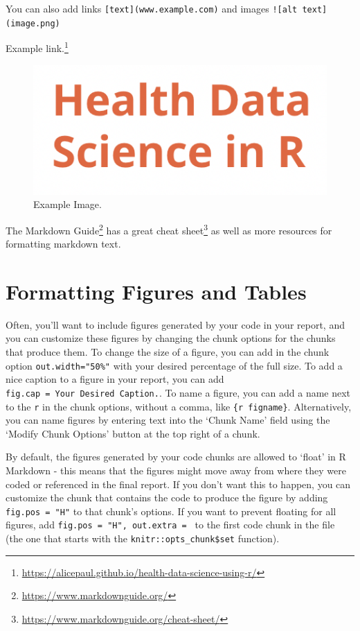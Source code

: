 \documentclass[
  letterpaper,
]{krantz}
\renewcommand{\href}[2]{#2\footnote{\url{#1}}}
\begin{document}
You can also add links \texttt{{[}text{]}(www.example.com)} and images
\texttt{!{[}alt\ text{]}(image.png)}

\href{https://alicepaul.github.io/health-data-science-using-r/}{Example
link.}

\begin{figure}

{\centering \includegraphics{book/../images/logo.png}

}

\caption{Example Image.}

\end{figure}

\href{https://www.markdownguide.org/}{The Markdown Guide} has a great
\href{https://www.markdownguide.org/cheat-sheet/}{cheat sheet} as well
as more resources for formatting markdown text.

\hypertarget{formatting-figures-and-tables}{%
\section{Formatting Figures and
Tables}\label{formatting-figures-and-tables}}

Often, you'll want to include figures generated by your code in your
report, and you can customize these figures by changing the chunk
options for the chunks that produce them. To change the size of a
figure, you can add in the chunk option \texttt{out.width="50\%"} with
your desired percentage of the full size. To add a nice caption to a
figure in your report, you can add
\texttt{fig.cap\ =\ \textquotesingle{}Your\ Desired\ Caption.}. To name
a figure, you can add a name next to the \texttt{r} in the chunk
options, without a comma, like \texttt{\{r\ figname\}}. Alternatively,
you can name figures by entering text into the `Chunk Name' field using
the `Modify Chunk Options' button at the top right of a chunk.

By default, the figures generated by your code chunks are allowed to
`float' in R Markdown - this means that the figures might move away from
where they were coded or referenced in the final report. If you don't
want this to happen, you can customize the chunk that contains the code
to produce the figure by adding \texttt{fig.pos\ =\ "H"} to that chunk's
options. If you want to prevent floating for all figures, add
\texttt{fig.pos\ =\ "H",\ out.extra\ =\ \textquotesingle{}\textquotesingle{}}
to the first code chunk in the file (the one that starts with the
\texttt{knitr::opts\_chunk\$set} function).
\end{document}
